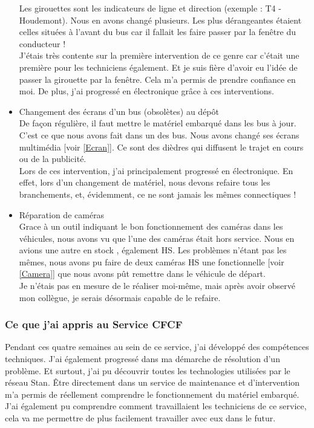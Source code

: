 \documentclass{article}
\begin{document}
\begin{itemize}
            Les girouettes sont les indicateurs de ligne et direction (exemple : 
            T4 - Houdemont). Nous en avons changé plusieurs. Les plus 
            dérangeantes étaient celles situées à l'avant du bus car il fallait 
            les faire passer par la fenêtre du conducteur ! \\
            J'étais très contente sur la première intervention de ce genre car c'était une 
            première pour les techniciens également. Et je suis fière d'avoir eu l'idée de passer la 
            girouette par la fenêtre. Cela m'a permis de prendre confiance en moi. 
            De plus, j'ai progressé en électronique grâce à ces interventions.
            \item Changement des écrans d'un bus (obsolètes) au dépôt\\
            De façon régulière, il faut mettre le matériel embarqué dans les bus à jour. C'est ce
            que nous avons fait dans un des bus. Nous avons changé ses écrans multimédia 
            [voir \ref{Ecran}]. Ce sont des dièdres qui diffusent le trajet en cours ou 
            de la publicité. \\
            Lors de ces intervention, j'ai principalement progressé en électronique. En effet,
            lors d'un changement de matériel, nous devons refaire tous les branchements, et,
            évidemment, ce ne sont jamais les mêmes connectiques ! 
            \item Réparation de caméras \\
            Grace à un outil indiquant le bon fonctionnement des caméras dans les véhicules,
            nous avons vu que l'une des caméras était hors service. Nous en avions une autre
            en stock , également HS. Les problèmes n'étant pas les mêmes, nous avons pu faire
            de deux caméras HS une fonctionnelle [voir \ref{Camera}] que nous avons pût remettre 
            dans le véhicule de départ.\\
            Je n'étais pas en mesure de le réaliser moi-même, mais après avoir observé mon collègue,
            je serais désormais capable de le refaire.
            
        \end{itemize}
        \bigbreak

        \subsubsection{Ce que j'ai appris au Service CFCF}
        Pendant ces quatre semaines au sein de ce service, j'ai 
        développé des compétences techniques. J'ai également progressé 
        dans ma démarche de résolution d'un problème. Et surtout, j'ai pu 
        découvrir toutes les technologies utilisées par le réseau Stan. \^Etre 
        directement dans un service de maintenance et d'intervention m'a permis
        de réellement comprendre le fonctionnement du matériel embarqué. J'ai 
        également pu comprendre comment travaillaient les techniciens de ce 
        service, cela va me permettre de plus facilement travailler avec eux 
        dans le futur.
\end{document}
